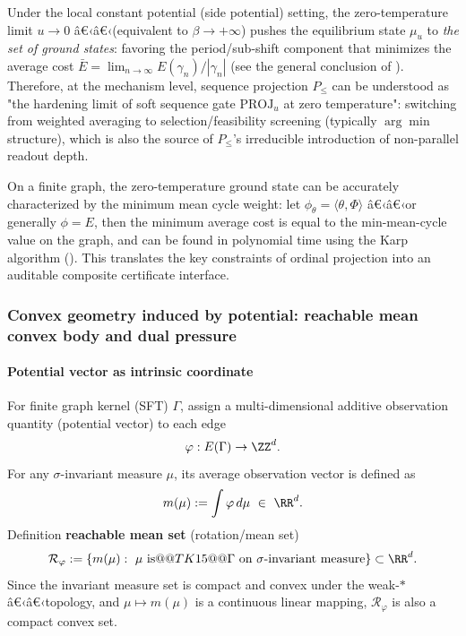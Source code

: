 \begin{remark}\label{rem:pom-order-as-zero-temp}
Under the local constant potential (side potential) setting, the zero-temperature limit $u\to 0$ â€‹â€‹(equivalent to $\beta\to+\infty$) pushes the equilibrium state $\mu_u$ to \emph{the set of ground states}: favoring the period/sub-shift component that minimizes the average cost $\bar E=\lim_{n\to\infty}E(\gamma_n)/|\gamma_n|$ (see the general conclusion of \cite{ChazottesGambaudoUgalde2011ZeroTempLocConst}). Therefore, at the mechanism level, sequence projection $P_{\le}$ can be understood as "the hardening limit of soft sequence gate $\mathrm{PROJ}_u$ at zero temperature": switching from weighted averaging to selection/feasibility screening (typically $\arg\min$ structure), which is also the source of $P_{\le}$'s irreducible introduction of non-parallel readout depth.

On a finite graph, the zero-temperature ground state can be accurately characterized by the minimum mean cycle weight: let $\phi_\theta=\langle\theta,\Phi\rangle$ â€‹â€‹or generally $\phi=E$, then the minimum average cost is equal to the min-mean-cycle value on the graph, and can be found in polynomial time using the Karp algorithm (\cite{Karp1978MinCycleMean}). This translates the key constraints of ordinal projection into an auditable composite certificate interface.
\end{remark}

\subsubsection{Convex geometry induced by potential: reachable mean convex body and dual pressure}\label{subsec:pom-potential-convex-geometry}
\paragraph{Potential vector as intrinsic coordinate}
For finite graph kernel (SFT) \(\Gamma\), assign a multi-dimensional additive observation quantity (potential vector) to each edge
$$
\varphi:E(\Gamma)\to \ZZ^d.
$$
For any \(\sigma\)-invariant measure \(\mu\), its average observation vector is defined as
$$
m(\mu):=\int \varphi\,d\mu\ \in\ \RR^d.
$$
Definition \textbf{reachable mean set} (rotation/mean set)
$$
\mathcal{R}_\varphi:=\{m(\mu):\ \mu\ \text{is}@@TK15@ @\Gamma\ \text{on}\ \sigma\text{-invariant measure}\}\subset\RR^d.
$$
Since the invariant measure set is compact and convex under the weak-\(\ast\) â€‹â€‹topology, and \(\mu\mapsto m(\mu)\) is a continuous linear mapping, \(\mathcal{R}_\varphi\) is also a compact convex set.

